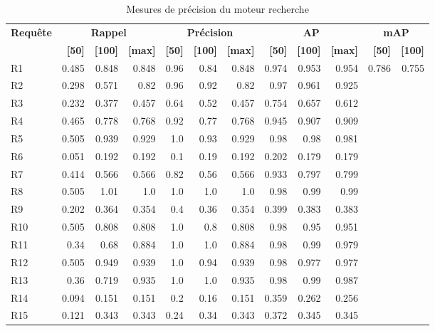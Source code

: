 \begin{table}[H]
\centering
\begin{tabular}{l|rrr|rrr|rrr|rr}
\toprule
\textbf{Requête} & \multicolumn{3}{c}{\textbf{Rappel}} & \multicolumn{3}{c}{\textbf{Précision}} & \multicolumn{3}{c}{\textbf{AP}} & \multicolumn{2}{c}{\textbf{mAP}} \\
 & \textbf{[50]} & \textbf{[100]} & \textbf{[max]} & \textbf{[50]} & \textbf{[100]} & \textbf{[max]} & \textbf{[50]} & \textbf{[100]} & \textbf{[max]} & \textbf{[50]} & \textbf{[100]} \\
\midrule
R1 & 0.485 & 0.848 & 0.848 & 0.96 & 0.84 & 0.848 & 0.974 & 0.953 & 0.954 & \multirow{15}{*}{0.786} & \multirow{15}{*}{0.755} \\
R2 & 0.298 & 0.571 & 0.82 & 0.96 & 0.92 & 0.82 & 0.97 & 0.961 & 0.925 \\
R3 & 0.232 & 0.377 & 0.457 & 0.64 & 0.52 & 0.457 & 0.754 & 0.657 & 0.612 \\
R4 & 0.465 & 0.778 & 0.768 & 0.92 & 0.77 & 0.768 & 0.945 & 0.907 & 0.909 \\
R5 & 0.505 & 0.939 & 0.929 & 1.0 & 0.93 & 0.929 & 0.98 & 0.98 & 0.981 \\
R6 & 0.051 & 0.192 & 0.192 & 0.1 & 0.19 & 0.192 & 0.202 & 0.179 & 0.179 \\
R7 & 0.414 & 0.566 & 0.566 & 0.82 & 0.56 & 0.566 & 0.933 & 0.797 & 0.799 \\
R8 & 0.505 & 1.01 & 1.0 & 1.0 & 1.0 & 1.0 & 0.98 & 0.99 & 0.99 \\
R9 & 0.202 & 0.364 & 0.354 & 0.4 & 0.36 & 0.354 & 0.399 & 0.383 & 0.383 \\
R10 & 0.505 & 0.808 & 0.808 & 1.0 & 0.8 & 0.808 & 0.98 & 0.95 & 0.951 \\
R11 & 0.34 & 0.68 & 0.884 & 1.0 & 1.0 & 0.884 & 0.98 & 0.99 & 0.979 \\
R12 & 0.505 & 0.949 & 0.939 & 1.0 & 0.94 & 0.939 & 0.98 & 0.977 & 0.977 \\
R13 & 0.36 & 0.719 & 0.935 & 1.0 & 1.0 & 0.935 & 0.98 & 0.99 & 0.987 \\
R14 & 0.094 & 0.151 & 0.151 & 0.2 & 0.16 & 0.151 & 0.359 & 0.262 & 0.256 \\
R15 & 0.121 & 0.343 & 0.343 & 0.24 & 0.34 & 0.343 & 0.372 & 0.345 & 0.345 \\
\bottomrule
\end{tabular}
\caption{Mesures de précision du moteur recherche}
\label{tab:results}
\end{table}
